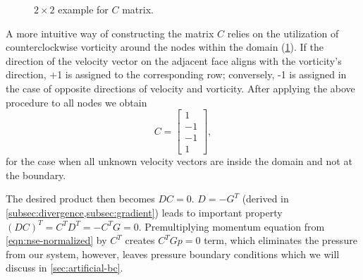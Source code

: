 \documentclass{article}
\numberwithin{equation}{section}
\begin{document}
\begin{figure}[H] %
  \caption{$2\times 2$ example for $C$ matrix.}\label{fig:C-example-2x2}
\end{figure}
A more intuitive way of constructing the matrix $C$ relies on the utilization of counterclockwise vorticity around the nodes within the domain (\cref{fig:C-example-2x2}). If the direction of the velocity vector on the adjacent face aligns with the vorticity's direction, +1 is assigned to the corresponding row; conversely, -1 is assigned in the case of opposite directions of velocity and vorticity. After applying the above procedure to all nodes we obtain
\begin{equation}
C=\left[
\begin{array}{rrrrrrrrr}
1\\
-1\\
-1\\
1
\end{array}
\right],
\end{equation}
for the case when all unknown velocity vectors are inside the domain and not at the boundary. 

The desired product then becomes $DC=0$. $D=-G^T$ (derived in \cref{subsec:divergence,subsec:gradient}) leads to important property $(DC)^T=C^TD^T=-C^TG=0$. Premultiplying momentum equation from \cref{eqn:nse-normalized} by $C^T$ creates $C^TGp=0$ term, which  eliminates the pressure from our system, however, leaves pressure boundary conditions which we will discuss in \cref{sec:artificial-bc}.
\end{document}
